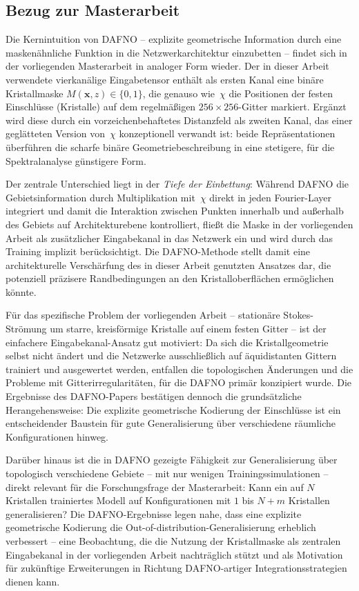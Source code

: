 \documentclass[a4paper,12pt]{article}
\begin{document}
\subsection*{Bezug zur Masterarbeit}

Die Kernintuition von DAFNO -- explizite geometrische Information durch eine
masken\"ahnliche Funktion in die Netzwerkarchitektur einzubetten -- findet sich
in der vorliegenden Masterarbeit in analoger Form wieder. Der in dieser Arbeit
verwendete vierkan\"alige Eingabetensor enth\"alt als ersten Kanal eine bin\"are
Kristallmaske $M(\mathbf{x},z) \in \{0,1\}$, die genauso wie~$\chi$ die
Positionen der festen Einschl\"usse (Kristalle) auf dem regelm\"a\ss{}igen
$256\times256$-Gitter markiert. Erg\"anzt wird diese durch ein vorzeichenbehaftetes
Distanzfeld als zweiten Kanal, das einer gegl\"atteten Version von~$\chi$
konzeptionell verwandt ist: beide Repr\"asentationen \"uberf\"uhren die scharfe
bin\"are Geometriebeschreibung in eine stetigere, f\"ur die Spektralanalyse
g\"unstigere Form.

Der zentrale Unterschied liegt in der \emph{Tiefe der Einbettung}: W\"ahrend
DAFNO die Gebietsinformation durch Multiplikation mit~$\chi$ direkt in jeden
Fourier-Layer integriert und damit die Interaktion zwischen Punkten innerhalb
und au\ss{}erhalb des Gebiets auf Architekturebene kontrolliert, flie\ss{}t die
Maske in der vorliegenden Arbeit als zus\"atzlicher Eingabekanal in das Netzwerk
ein und wird durch das Training implizit ber\"ucksichtigt. Die DAFNO-Methode
stellt damit eine architekturelle Versch\"arfung des in dieser Arbeit genutzten
Ansatzes dar, die potenziell pr\"azisere Randbedingungen an den Kristalloberfl\"achen
erm\"oglichen k\"onnte.

F\"ur das spezifische Problem der vorliegenden Arbeit -- station\"are Stokes-Str\"omung
um starre, kreisf\"ormige Kristalle auf einem festen Gitter -- ist der einfachere
Eingabekanal-Ansatz gut motiviert: Da sich die Kristallgeometrie selbst nicht \"andert
und die Netzwerke ausschlie\ss{}lich auf \"aquidistanten Gittern trainiert und ausgewertet
werden, entfallen die topologischen \"Anderungen und die Probleme mit Gitterirregularit\"aten,
f\"ur die DAFNO prim\"ar konzipiert wurde. Die Ergebnisse des DAFNO-Papers best\"atigen
dennoch die grunds\"atzliche Herangehensweise: Die explizite geometrische Kodierung
der Einschl\"usse ist ein entscheidender Baustein f\"ur gute Generalisierung \"uber
verschiedene r\"aumliche Konfigurationen hinweg.

Dar\"uber hinaus ist die in DAFNO gezeigte F\"ahigkeit zur Generalisierung \"uber
topologisch verschiedene Gebiete -- mit nur wenigen Trainingssimulationen -- direkt
relevant f\"ur die Forschungsfrage der Masterarbeit: Kann ein auf $N$ Kristallen
trainiertes Modell auf Konfigurationen mit $1$ bis $N+m$ Kristallen generalisieren?
Die DAFNO-Ergebnisse legen nahe, dass eine explizite geometrische Kodierung die
Out-of-distribution-Generalisierung erheblich verbessert -- eine Beobachtung, die
die Nutzung der Kristallmaske als zentralen Eingabekanal in der vorliegenden
Arbeit nachtr\"aglich st\"utzt und als Motivation f\"ur zuk\"unftige Erweiterungen
in Richtung DAFNO-artiger Integrationsstrategien dienen kann.
\end{document}
